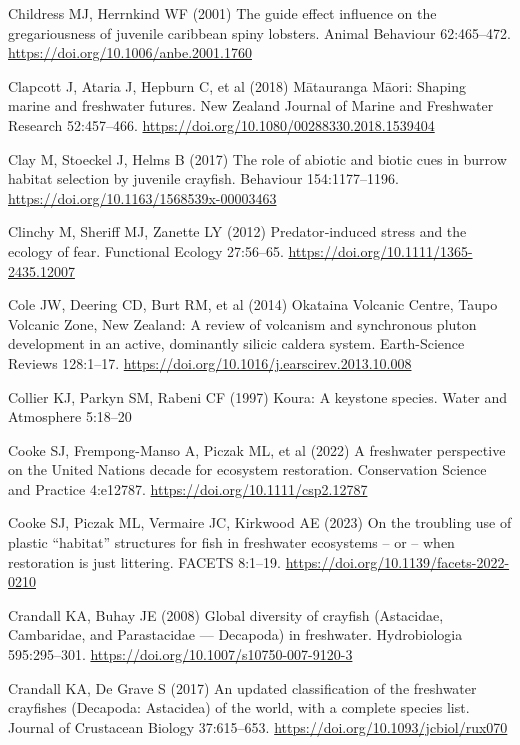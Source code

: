 \documentclass[
  12pt,
  a4paper,
  oneside]{scrbook}
\newlength{\cslhangindent}
\newenvironment{CSLReferences}[2] %
 {\begin{list}{}{%
  \setlength{\itemindent}{0pt}
  \setlength{\leftmargin}{0pt}
  \setlength{\parsep}{0pt}
  \ifodd #1
   \setlength{\leftmargin}{\cslhangindent}
   \setlength{\itemindent}{-1\cslhangindent}
  \fi
  \setlength{\itemsep}{#2\baselineskip}}}
 {\end{list}}
\begin{document}
\begin{CSLReferences}{1}{1}
Childress MJ, Herrnkind WF (2001) The guide effect influence on the
gregariousness of juvenile caribbean spiny lobsters. Animal Behaviour
62:465--472. \url{https://doi.org/10.1006/anbe.2001.1760}

Clapcott J, Ataria J, Hepburn C, et al (2018) {Mātauranga Māori}:
Shaping marine and freshwater futures. New Zealand Journal of Marine and
Freshwater Research 52:457--466.
\url{https://doi.org/10.1080/00288330.2018.1539404}

Clay M, Stoeckel J, Helms B (2017) The role of abiotic and biotic cues
in burrow habitat selection by juvenile crayfish. Behaviour
154:1177--1196. \url{https://doi.org/10.1163/1568539x-00003463}

Clinchy M, Sheriff MJ, Zanette LY (2012) Predator‐induced stress and the
ecology of fear. Functional Ecology 27:56--65.
\url{https://doi.org/10.1111/1365-2435.12007}

Cole JW, Deering CD, Burt RM, et al (2014) {Okataina Volcanic Centre,
Taupo Volcanic Zone, New Zealand}: A review of volcanism and synchronous
pluton development in an active, dominantly silicic caldera system.
Earth-Science Reviews 128:1--17.
\url{https://doi.org/10.1016/j.earscirev.2013.10.008}

Collier KJ, Parkyn SM, Rabeni CF (1997) Koura: A keystone species. Water
and Atmosphere 5:18--20

Cooke SJ, Frempong-Manso A, Piczak ML, et al (2022) A freshwater
perspective on the {United Nations} decade for ecosystem restoration.
Conservation Science and Practice 4:e12787.
\url{https://doi.org/10.1111/csp2.12787}

Cooke SJ, Piczak ML, Vermaire JC, Kirkwood AE (2023) On the troubling
use of plastic {``habitat''} structures for fish in freshwater
ecosystems -- or -- when restoration is just littering. FACETS 8:1--19.
\url{https://doi.org/10.1139/facets-2022-0210}

Crandall KA, Buhay JE (2008) Global diversity of crayfish ({Astacidae,
Cambaridae}, and {Parastacidae} --- {Decapoda}) in freshwater.
Hydrobiologia 595:295--301.
\url{https://doi.org/10.1007/s10750-007-9120-3}

Crandall KA, De Grave S (2017) An updated classification of the
freshwater crayfishes ({Decapoda: Astacidea}) of the world, with a
complete species list. Journal of Crustacean Biology 37:615--653.
\url{https://doi.org/10.1093/jcbiol/rux070}


\end{CSLReferences}
\end{document}
